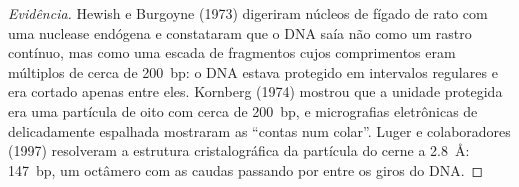 \begin{proof}[Evidência]
Hewish e Burgoyne (1973) digeriram núcleos de fígado de rato com uma
nuclease endógena e constataram que o DNA saía não como um rastro
contínuo, mas como uma escada de fragmentos cujos comprimentos eram
múltiplos de cerca de \qty{200}{bp}: o DNA estava protegido em
intervalos regulares e era cortado apenas entre eles. Kornberg (1974)
mostrou que a unidade protegida era uma partícula de oito  com
cerca de \qty{200}{bp}, e micrografias eletrônicas de 
delicadamente espalhada mostraram as ``contas num colar''. Luger e
colaboradores (1997) resolveram a estrutura cristalográfica da
partícula do cerne a \qty{2.8}{\angstrom}: \qty{147}{bp}, um octâmero
com as caudas passando por entre os giros do DNA.
\end{proof}

